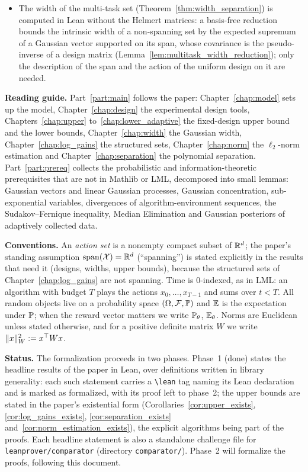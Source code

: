 \begin{itemize}
        (Lemma~\ref{lem:rademacher_square_subexp}), and the Gaussian Hanson--Wright inequality
        by diagonalization (Lemma~\ref{lem:gauss_quadratic_form_subexp}); the paper's
        tail-to-MGF lemma is not needed.
  \item The width of the multi-task set (Theorem~\ref{thm:width_separation}) is computed in
        Lean without the Helmert matrices: a basis-free reduction bounds the intrinsic width of
        a non-spanning set by the expected supremum of a Gaussian vector supported on its span,
        whose covariance is the pseudo-inverse of a design matrix
        (Lemma~\ref{lem:multitask_width_reduction}); only the description of the span and
        the action of the uniform design on it are needed.
\end{itemize}

\textbf{Reading guide.}
Part~\ref{part:main} follows the paper: Chapter~\ref{chap:model} sets up the model,
Chapter~\ref{chap:design} the experimental design tools, Chapters~\ref{chap:upper}
to~\ref{chap:lower_adaptive} the fixed-design upper bound and the lower bounds,
Chapter~\ref{chap:width} the Gaussian width, Chapter~\ref{chap:log_gains} the structured
sets, Chapter~\ref{chap:norm} the $\ell_2$-norm estimation and Chapter~\ref{chap:separation}
the polynomial separation.
Part~\ref{part:prereq} collects the probabilistic and information-theoretic prerequisites
that are not in Mathlib or LML, decomposed into small lemmas: Gaussian vectors and linear
Gaussian processes, Gaussian concentration, sub-exponential variables, divergences of
algorithm-environment sequences, the Sudakov--Fernique inequality, Median Elimination and
Gaussian posteriors of adaptively collected data.

\textbf{Conventions.} An \emph{action set} is a nonempty compact subset of $\mathbb{R}^d$; the
paper's standing assumption $\operatorname{span}(\mathcal{X}) = \mathbb{R}^d$ (``spanning'') is stated explicitly in the
results that need it (designs, widths, upper bounds), because the structured sets of
Chapter~\ref{chap:log_gains} are not spanning. Time is $0$-indexed, as in LML: an algorithm with budget $T$ plays the
actions $x_0, \dots, x_{T-1}$ and sums over $t < T$. All random objects live on a probability
space $(\Omega, \mathcal{F}, \mathbb{P})$ and $\mathbb{E}$ is the expectation under $\mathbb{P}$; when the
reward vector matters we write $\mathbb{P}_\theta$, $\mathbb{E}_\theta$. Norms are Euclidean unless stated
otherwise, and for a positive definite matrix $W$ we write $\lVert x \rVert_W^2 := x^\top W x$.

\textbf{Status.} The formalization proceeds in two phases. Phase~1 (done) states the headline
results of the paper in Lean, over definitions written in library generality: each such
statement carries a \verb+\lean+ tag naming its Lean declaration and is marked as formalized,
with its proof left to phase~2; the upper bounds are stated in the paper's existential form
(Corollaries~\ref{cor:upper_exists}, \ref{cor:log_gains_exists}, \ref{cor:separation_exists}
and~\ref{cor:norm_estimation_exists}), the explicit algorithms being part of the proofs. Each
headline statement is also a standalone challenge file for \texttt{leanprover/comparator}
(directory \texttt{comparator/}). Phase~2 will formalize the proofs, following this document.

